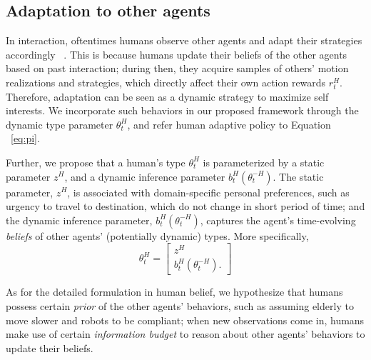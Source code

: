 \documentclass[letterpaper, 10 pt, conference]{ieeeconf}  %
\begin{document}
\subsection{Adaptation to other agents}\label{sec:adaptability}
\vspace{-.2em}
In interaction, oftentimes humans observe other agents and adapt their 
strategies accordingly ~\cite{nikolaidis2016formalizing,yang2017evaluating}. 
This is because humans update their beliefs of the other agents based on past 
interaction; during then, they acquire samples of others' motion realizations 
and strategies, which directly affect their own action rewards $r^H_t$. 
Therefore, adaptation can be seen as a dynamic strategy to maximize self 
interests. We incorporate such behaviors in our proposed framework 
through the dynamic type parameter $\theta^H_t$, and refer human adaptive 
policy to Equation ~\ref{eq:pi}. 

Further, we propose that a human's type $\theta^H_t$ is parameterized by a 
static parameter $z^H$, and a dynamic inference parameter 
$b^H_t(\theta^{-H}_t)$. The static parameter, $z^H$, is associated with 
domain-specific personal 
preferences, such as urgency to travel to destination, which do not change in 
short period of time; and the 
dynamic inference parameter, $b^H_t(\theta^{-H}_t)$, captures the agent's 
time-evolving \textit{beliefs} of other agents' (potentially dynamic) types. More specifically,
\begin{equation}
  \theta^H_t = \begin{bmatrix}
    z^H \\
    b^H_t(\theta^{-H}_t).
  \end{bmatrix}
\end{equation}

As for the detailed formulation in human belief, we hypothesize that humans 
possess certain \textit{prior} of the other agents' behaviors, such as assuming 
elderly to move slower and robots to be compliant; when new observations come 
in, humans make use of certain \textit{information budget} to reason about 
other agents' behaviors to update their beliefs.

\end{document}
